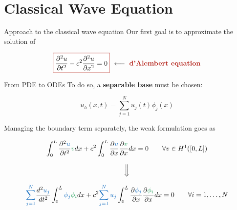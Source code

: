 \section{Classical Wave Equation}

\begin{frame}{Approach to the classical wave equation}
    Our first goal is to approximate the solution of

    \begin{equation*}
        \fcolorbox{BrickRed}{white}{$\displaystyle\frac{\partial^2u}{\partial t^2}-c^2\frac{\partial^2u}{\partial x^2}=0$} \ \longleftarrow \ \text{\textbf{\textcolor{BrickRed}{d'Alembert equation}}}
    \end{equation*}

    \vfill

    \pause

    
\end{frame}

\begin{frame}{From PDE to ODEs}
    To do so, a \textbf{separable base} must be chosen:

    \begin{equation*}
        u_h(x,t)=\sum_{j=1}^Nu_j(t)\phi_j(x)
    \end{equation*}

    \vfill

    \pause

    Managing the boundary term separately, the weak formulation goes as

    \small

    \begin{equation*}
        \int_0^L\frac{\partial^2\textcolor{RoyalBlue}{u}}{\partial t^2}\textcolor{ForestGreen}{v}dx+c^2\int_0^L\frac{\partial\textcolor{RoyalBlue}{u}}{\partial x}\frac{\partial\textcolor{ForestGreen}{v}}{\partial x}dx=0 \qquad \forall v\in H^1([0,L])
    \end{equation*}

    \pause

    \begin{equation*}
        \Big\Downarrow
    \end{equation*}

    \vspace{-0.35cm}

    \begin{equation*}
        \textcolor{RoyalBlue}{\sum_{j=1}^N}\frac{d^2\textcolor{RoyalBlue}{u_j}}{dt^2}\int_0^L\textcolor{RoyalBlue}{\phi_j}\textcolor{ForestGreen}{\phi_i}dx+c^2\textcolor{RoyalBlue}{\sum_{j=1}^Nu_j}\int_0^L\frac{\partial\textcolor{RoyalBlue}{\phi_j}}{\partial x}\frac{\partial\textcolor{ForestGreen}{\phi_i}}{\partial x}dx=0 \qquad \forall i=1,\dots,N
    \end{equation*}

    \normalsize
\end{frame}

